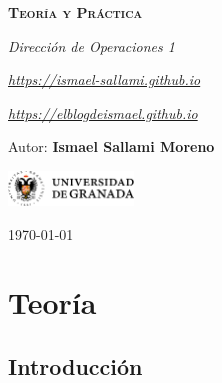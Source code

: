 \documentclass[12pt]{report} %
\begin{document}
\begin{titlepage}
    \begin{center}
        \vspace*{2cm}
        
        {\Huge \bfseries\scshape Teoría y Práctica \par}
        \vspace{0.5cm}
        {\Large \itshape Dirección de Operaciones 1 \par}
        \vspace{0.5cm}
        {\small \itshape \href{https://ismael-sallami.github.io}{https://ismael-sallami.github.io} \par}
        {\small \itshape \href{https://elblogdeismael.github.io}{https://elblogdeismael.github.io} \par}


        \vfill
        
        {\LARGE Autor: \textbf{Ismael Sallami Moreno} \par}
        \vspace{0.3cm}
        
        \vspace{1cm}
        \includegraphics[width=0.25\textwidth]{../../../extraFiles/img/ugr.png} %
        \vspace{1cm}
        
        {\large \today}
    \end{center}
    
    \restoregeometry
\end{titlepage}


\thispagestyle{empty} %
\clearpage

\tableofcontents
\listoffigures
\clearpage

\listoftables
\clearpage
\thispagestyle{empty} %
\clearpage

\part{Teoría}

\hypertarget{introducciuxf3n}{%
\chapter{Introducción}\label{introducciuxf3n}}
\end{document}
